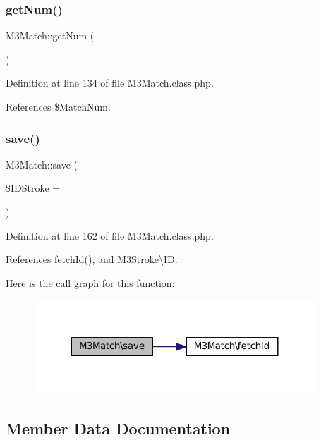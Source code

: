 \subsubsection{\texorpdfstring{get\+Num()}{getNum()}}
{\footnotesize\ttfamily M3\+Match\+::get\+Num (\begin{DoxyParamCaption}{ }\end{DoxyParamCaption})}



Definition at line 134 of file M3\+Match.\+class.\+php.



References \$\+Match\+Num.

\mbox{\label{class_m3_match_a999157933b67a6f6615ea58a1c7d1677}} 
\subsubsection{\texorpdfstring{save()}{save()}}
{\footnotesize\ttfamily M3\+Match\+::save (\begin{DoxyParamCaption}\item[{}]{\$\+I\+D\+Stroke = {} }\end{DoxyParamCaption})}



Definition at line 162 of file M3\+Match.\+class.\+php.



References fetch\+Id(), and M3\+Stroke\textbackslash{}\+ID.

Here is the call graph for this function\+:\nopagebreak
\begin{figure}[H]
\begin{center}
\leavevmode
\includegraphics[width=299pt]{class_m3_match_a999157933b67a6f6615ea58a1c7d1677_cgraph}
\end{center}
\end{figure}


\subsection{Member Data Documentation}
\mbox{\label{class_m3_match_ad0122832fc8f30405639005971b76e4b}} 
